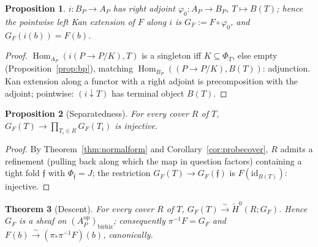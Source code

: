 \documentclass[11pt]{article}
\newtheorem{theorem}{Theorem}[section]
\newtheorem{proposition}[theorem]{Proposition}
\theoremstyle{definition}
\newcommand{\op}{\mathrm{op}}
\newcommand{\HH}{\check{H}}
\begin{document}
\begin{proposition}\label{prop:adj}
$i:B_P\to A_P$ has right adjoint $\varphi_0:A_P\to B_P$,
$T\mapsto B(T)$; hence the pointwise left Kan extension of $F$ along
$i$ is $G_F:=F\circ\varphi_0$, and $G_F(i(b))=F(b)$.
\end{proposition}

\begin{proof}
$\operatorname{Hom}_{A_P}(i(P\to P/K),T)$ is a singleton iff
$K\subseteq\Phi_T$, else empty (Proposition~\ref{prop:bp}), matching
$\operatorname{Hom}_{B_P}((P\to P/K),B(T))$: adjunction. Kan
extension along a functor with a right adjoint is precomposition with
the adjoint; pointwise: $(i\downarrow T)$ has terminal object $B(T)$.
\end{proof}

\begin{proposition}[Separatedness]\label{prop:sep}
For every cover $R$ of $T$, $G_F(T)\to\prod_{T_i\in
R}G_F(T_i)$ is injective.
\end{proposition}

\begin{proof}
By Theorem~\ref{thm:normalform} and Corollary~\ref{cor:probecover},
$R$ admits a refinement (pulling back along which the map in question
factors) containing a tight fold $\mathfrak f$ with
$\Phi_{\mathfrak f}=J$; the restriction $G_F(T)\to
G_F(\mathfrak f)$ is $F(\mathrm{id}_{B(T)})$: injective.
\end{proof}

\begin{theorem}[Descent]\label{thm:descent}
For every cover $R$ of $T$, $G_F(T)\xrightarrow{\sim}\HH^0(R;G_F)$.
Hence $G_F$ is a sheaf on $(A_P^{\op})_{\mathrm{birhiz}}$;
consequently $\pi^{-1}F=G_F$ and
$F(b)\xrightarrow{\sim}(\pi_*\pi^{-1}F)(b)$, canonically.
\end{theorem}
\end{document}
